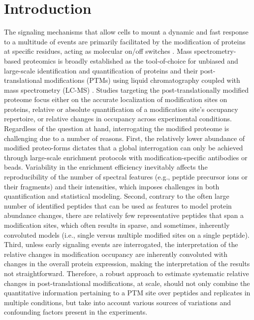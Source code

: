 \documentclass[mcp]{article}
\numberwithin{table}{section}
\begin{document}
\section{Introduction}

The signaling mechanisms that allow cells to mount a dynamic and fast response to a multitude of events are primarily facilitated by the modification of proteins at specific residues, acting as molecular on/off switches\cite{Deribe} \cite{Cohen}. Mass spectrometry-based proteomics is broadly established as the tool-of-choice for unbiased and large-scale identification and quantification of proteins and their post-translational modifications (PTMs) using liquid chromatography coupled with mass spectrometry (LC-MS)\cite{Kall:2011ub} \cite{Roepstorff}. Studies targeting the post-translationally modified proteome focus either on the accurate localization of modification sites on proteins, relative or absolute quantification of a modification site's occupancy repertoire, or relative changes in occupancy across experimental conditions\cite{Mann}. Regardless of the question at hand, interrogating the modified proteome is challenging due to a number of reasons. First, the relatively lower abundance of modified proteo-forms dictates that a global interrogation can only be achieved through large-scale enrichment protocols with modification-specific antibodies or beads. Variability in the enrichment efficiency inevitably affects the reproducibility of the number of spectral features (e.g., peptide precursor ions or their fragments) and their intensities, which imposes challenges in both quantification and statistical modeling. Second, contrary to the often large number of identified peptides that can be used as features to model protein abundance changes, there are relatively few representative peptides that span a modification sites, which often results in sparse, and sometimes, inherently convoluted models (i.e., single versus multiple modified sites on a single peptide). Third, unless early signaling events are interrogated, the interpretation of the relative changes in modification occupancy are inherently convoluted with changes in the overall protein expression, making the interpretation of the results not straightforward\cite{Olsen:2013}. Therefore, a robust approach to estimate systematic relative changes in post-translational modifications, at scale, should not only combine the quantitative information pertaining to a PTM site over peptides and replicates in multiple conditions, but take into account various sources of variations and confounding factors present in the experiments.
\end{document}
